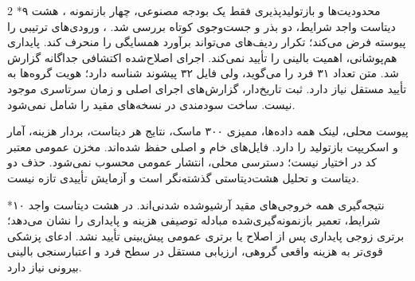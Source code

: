 \documentclass[10pt,a4paper]{article}
\makeatletter
\renewcommand{\section}{\@startsection{section}{1}{0pt}{5pt}{2pt}{\normalfont\normalsize\bfseries}}
\newcommand{\sect}[1]{\section*{#1}}
\makeatother
\begin{document}
\begin{multicols}{2}
\sect{۹  محدودیت‌ها و بازتولیدپذیری}
فقط یک بودجه مصنوعی، چهار بازنمونه ، هشت دیتاست واجد شرایط، دو بذر و جست‌وجوی کوتاه بررسی شد. ، ورودی‌های ترتیبی  را پیوسته فرض می‌کند؛ تکرار ردیف‌های  می‌تواند برآورد همسایگی  را منحرف کند. پایداری هم‌پوشانی، اهمیت بالینی را تأیید نمی‌کند. اجرای اصلاح‌شده اکتشافی جداگانه گزارش شد. متن  تعداد ۳۱ فرد را می‌گوید، ولی فایل ۳۲ پیشوند شناسه دارد؛ هویت گروه‌ها به تأیید مستقل نیاز دارد. ثبت تاریخ‌دار، گزارش‌های اجرای اصلی و زمان سرتاسری موجود نیست.  ساخت سودمندی  در نسخه‌های مقید را شامل نمی‌شود.

پیوست محلی، لینک همه داده‌ها، ممیزی ۳۰۰ ماسک، نتایج هر دیتاست، بردار هزینه، آمار و اسکریپت بازتولید را دارد. فایل‌های خام و اصلی حفظ شده‌اند. مخزن عمومی معتبر کد در اختیار نیست؛ دسترسی محلی، انتشار عمومی محسوب نمی‌شود. حذف دو دیتاست و تحلیل هشت‌دیتاستی گذشته‌نگر است و آزمایش تأییدی تازه نیست.

\sect{۱۰  نتیجه‌گیری}
همه خروجی‌های مقید آرشیوشده شدنی‌اند. در هشت دیتاست واجد شرایط، تعمیر بازنمونه‌گیری‌شده مبادله توصیفی هزینه و پایداری را نشان می‌دهد؛ برتری زوجی پایداری پس از اصلاح یا برتری عمومی پیش‌بینی تأیید نشد. ادعای پزشکی قوی‌تر به هزینه واقعی گروهی، ارزیابی مستقل در سطح فرد و اعتبارسنجی بالینی بیرونی نیاز دارد.


\end{multicols}
\end{document}
